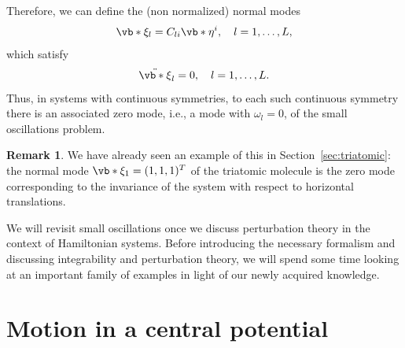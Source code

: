 \documentclass[english,fontsize=11pt,paper=b5]{scrbook}
\numberwithin{equation}{chapter}
\theoremstyle{definition}
\newtheorem{remark}{Remark}[chapter]
\begin{document}
    Therefore, we can define the (non normalized) normal modes
    \begin{equation}
      \vb*{\xi}_l = C_{li} \vb*{\eta}^i, \quad l=1,\ldots, L,
    \end{equation}
    which satisfy
    \begin{equation}
      \ddot{\vb*{\xi}}_l = 0, \quad l=1,\ldots, L.
    \end{equation}
    Thus, in systems with continuous symmetries, to each such continuous symmetry there is an associated zero mode, i.e., a mode with $\omega_l = 0$, of the small oscillations problem.

    \begin{remark}
      We have already seen an example of this in Section~\ref{sec:triatomic}: the normal mode $\vb*{\xi}_1=(1,1,1)^T$ of the triatomic molecule is the zero mode corresponding to the invariance of the system with respect to horizontal translations.
    \end{remark}
    \medskip

    We will revisit small oscillations once we discuss perturbation theory in the context of Hamiltonian systems. Before introducing the necessary formalism and discussing integrability and perturbation theory, we will spend some time looking at an important family of examples in light of our newly acquired knowledge.

    \section{Motion in a central potential}
\end{document}
